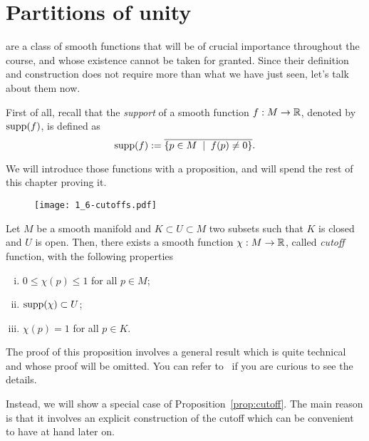 \section{Partitions of unity}\label{sec:partition_of_unity}

 are a class of smooth functions that will be of crucial importance throughout the course,
and whose existence cannot be taken for granted.
Since their definition and construction does not require more than what we have just seen, let's talk about them now.

First of all, recall that the \emph{support} of a smooth function $f: M \to \mathbb{R}$, denoted by $\operatorname{supp}(f)$, is defined as
\begin{equation}
	\operatorname{supp}(f) := \overline{\{ p\in M \;\mid\; f(p) \neq 0\}}.
\end{equation}

We will introduce those functions with a proposition, and will spend the rest of this chapter proving it.

\begin{figure}[htp!]
	\texttt{[image: 1\_6-cutoffs.pdf]}
\end{figure}

\begin{proposition}\label{prop:cutoff}
	Let $M$ be a smooth manifold and $K\subset U\subset M$ two subsets such that $K$ is closed and $U$ is open.
	Then, there exists a smooth function $\chi: M \to\mathbb{R}$, called \emph{cutoff} function, with the following properties
	\begin{enumerate}[(i)]
		\item $0 \leq \chi(p) \leq 1$ for all $p\in M$;
		\item $\operatorname{supp}(\chi)\subset U$;
		\item $\chi(p) = 1$ for all $p\in K$.
	\end{enumerate}
\end{proposition}

The proof of this proposition involves a general result which is quite technical and whose proof will be omitted.
You can refer to~\cite{book:lee, book:tu} if you are curious to see the details.

Instead, we will show a special case of Proposition~\ref{prop:cutoff}. The main reason is that it involves an explicit construction of the cutoff which can be convenient to have at hand later on.

